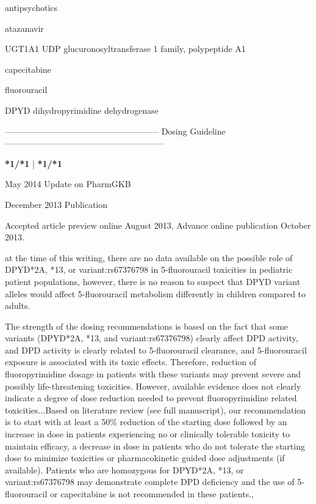 \documentclass{resume} %
\begin{document}
\begin{rSection}{ antipsychotics }
\begin{rSection}{ atazanavir }
\begin{rSubsection}{ UGT1A1 }{ UDP glucuronosyltransferase 1 family, polypeptide A1 }{}{}
\begin{rSection}{ capecitabine }
\begin{rSection}{ fluorouracil }
\item[]
\begin{rSubsection}{ DPYD }{ dihydropyrimidine dehydrogenase }{}{}
\item[]
\item[] ------------------------------------------------------ Dosing Guideline --------------------------------------------------------\newline
\item[]
\item[] \textbf{ *1/*1 } | \textbf{ *1/*1 }
\item May 2014 Update on PharmGKB
 \newline
\item December 2013 Publication
 \newline
\item Accepted article preview online August 2013,  Advance online publication October 2013.
 \newline
\item at the time of this writing, there are no data available on the possible role of DPYD*2A, *13, or variant:rs67376798 in 5-fluorouracil toxicities in pediatric patient populations,  however, there is no reason to suspect that DPYD variant alleles would affect 5-fluorouracil metabolism differently in children compared to adults.
 \newline
\item The strength of the dosing recommendations is based on the fact that some variants (DPYD*2A, *13, and variant:rs67376798) clearly affect DPD activity, and DPD activity is clearly related to 5-fluorouracil clearance, and 5-fluorouracil exposure is associated with its toxic effects. Therefore, reduction of fluoropyrimidine dosage in patients with these variants may prevent severe and possibly life-threatening toxicities. However, available evidence does not clearly indicate a degree of dose reduction needed to prevent fluoropyrimidine related toxicities...Based on literature review (see full manuscript), our recommendation is to start with at least a 50\% reduction of the starting dose followed by an increase in dose in patients experiencing no or clinically tolerable toxicity to maintain efficacy, a decrease in dose in patients who do not tolerate the starting dose to minimize toxicities or pharmacokinetic guided dose adjustments (if available). Patients who are homozygous for DPYD*2A, *13, or variant:rs67376798 may demonstrate complete DPD deficiency and the use of 5-fluorouracil or capecitabine is not recommended in these patients.,  

\end{rSubsection}
\end{rSection}
\end{rSection}
\end{rSubsection}
\end{rSection}
\end{rSection}
\end{document}
